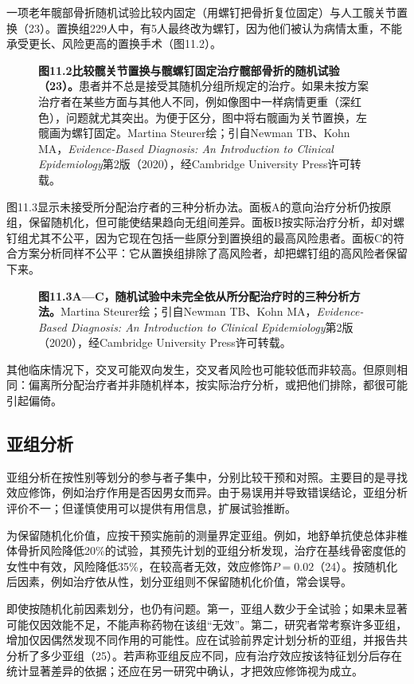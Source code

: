一项老年髋部骨折随机试验比较内固定（用螺钉把骨折复位固定）与人工髋关节置换（23）。置换组229人中，有5人最终改为螺钉，因为他们被认为病情太重，不能承受更长、风险更高的置换手术（图11.2）。
\begin{figure}[htbp]\centering\chElevenHip
\caption*{\textbf{图11.2\quad 比较髋关节置换与髋螺钉固定治疗髋部骨折的随机试验（23）。}患者并不总是接受其随机分组所规定的治疗。如果未按方案治疗者在某些方面与其他人不同，例如像图中一样病情更重（深红色），问题就尤其突出。为便于区分，图中将右髋画为关节置换，左髋画为螺钉固定。Martina Steurer绘；引自Newman TB、Kohn MA，\textit{Evidence-Based Diagnosis: An Introduction to Clinical Epidemiology}第2版（2020），经Cambridge University Press许可转载。}
\end{figure}
图11.3显示未接受所分配治疗者的三种分析办法。面板A的意向治疗分析仍按原组，保留随机化，但可能使结果趋向无组间差异。面板B按实际治疗分析，却对螺钉组尤其不公平，因为它现在包括一些原分到置换组的最高风险患者。面板C的符合方案分析同样不公平：它从置换组排除了高风险者，却把螺钉组的高风险者保留下来。
\begin{figure}[htbp]\centering\chElevenAnalysis
\caption*{\textbf{图11.3\quad A—C，随机试验中未完全依从所分配治疗时的三种分析方法。}Martina Steurer绘；引自Newman TB、Kohn MA，\textit{Evidence-Based Diagnosis: An Introduction to Clinical Epidemiology}第2版（2020），经Cambridge University Press许可转载。}
\end{figure}
其他临床情况下，交叉可能双向发生，交叉者风险也可能较低而非较高。但原则相同：偏离所分配治疗者并非随机样本，按实际治疗分析，或把他们排除，都很可能引起偏倚。

\subsection{亚组分析}
亚组分析在按性别等划分的参与者子集中，分别比较干预和对照。主要目的是寻找效应修饰，例如治疗作用是否因男女而异。由于易误用并导致错误结论，亚组分析评价不一；但谨慎使用可以提供有用信息，扩展试验推断。

为保留随机化价值，应按干预实施前的测量界定亚组。例如，地舒单抗使总体非椎体骨折风险降低20\%的试验，其预先计划的亚组分析发现，治疗在基线骨密度低的女性中有效，风险降低35\%，在较高者无效，效应修饰$P=0.02$（24）。按随机化后因素，例如治疗依从性，划分亚组则不保留随机化价值，常会误导。

即使按随机化前因素划分，也仍有问题。第一，亚组人数少于全试验；如果未显著可能仅因效能不足，不能声称药物在该组“无效”。第二，研究者常考察许多亚组，增加仅因偶然发现不同作用的可能性。应在试验前界定计划分析的亚组，并报告共分析了多少亚组（25）。若声称亚组反应不同，应有治疗效应按该特征划分后存在统计显著差异的依据；还应在另一研究中确认，才把效应修饰视为成立。

